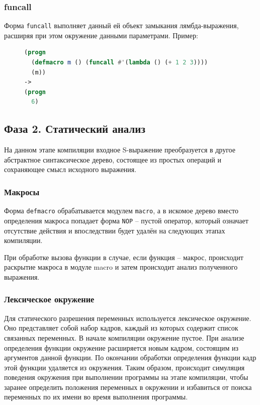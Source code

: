 \subsubsection{funcall}

Форма \texttt{funcall} выполняет данный ей объект замыкания лямбда-выражения, расширяя при этом окружение данными параметрами. Пример:

\begin{figure}[H]
\begin{lstlisting}[language=Lisp]
(progn
  (defmacro m () (funcall #'(lambda () (+ 1 2 3))))
  (m))
->
(progn
  6)
\end{lstlisting}
\end{figure}


\subsection{Фаза 2. Статический анализ}

На данном этапе компиляции входное S-выражение преобразуется в другое абстрактное синтаксическое дерево, состоящее из простых операций и сохраняющее смысл исходного выражения.

\subsubsection{Макросы}

Форма \texttt{defmacro} обрабатывается модулем \texttt{macro}, а в искомое дерево вместо определения макроса попадает форма \texttt{NOP} -- пустой оператор, который означает отсутствие действия и впоследствии будет удалён на следующих этапах компиляции.

При обработке вызова функции в случае, если функция -- макрос, происходит раскрытие макроса в модуле macro и затем происходит анализ полученного выражения.

\subsubsection{Лексическое окружение}

Для статического разрешения переменных используется лексическое окружение. Оно представляет собой набор кадров, каждый из которых содержит список связанных переменных. В начале компиляции окружение пустое. При анализе определения функции окружение расширяется новым кадром, состоящим из аргументов данной функции. По окончании обработки определения функции кадр этой функции удаляется из окружения. Таким образом, происходит симуляция поведения окружения при выполнении программы на этапе компиляции, чтобы заранее определить положения переменных в окружении и избавиться от поиска переменных по их имени во время выполнения программы.

